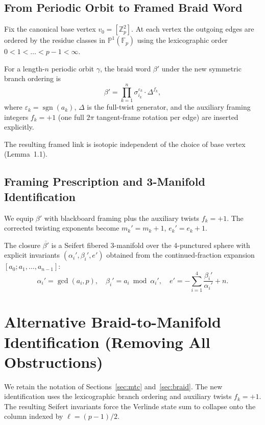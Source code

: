 \documentclass[11pt,a4paper]{amsart}
\begin{document}
\subsection{From Periodic Orbit to Framed Braid Word}
\label{subsec:braid-encoding}

Fix the canonical base vertex \(v_0 = [\mathbb{Z}_p^2]\). At each vertex the outgoing edges are ordered by the residue classes in \(\mathbb{P}^1(\mathbb{F}_p)\) using the lexicographic order \(0 < 1 < \dots < p-1 < \infty\).

For a length-\(n\) periodic orbit \(\gamma\), the braid word \(\beta'\) under the new symmetric branch ordering is
\[
\beta' = \prod_{k=1}^{n} \sigma_{i_k}^{\varepsilon_k} \cdot \Delta^{f_k},
\]
where \(\varepsilon_k = \operatorname{sgn}(a_k)\), \(\Delta\) is the full-twist generator, and the auxiliary framing integers \(f_k = +1\) (one full \(2\pi\) tangent-frame rotation per edge) are inserted explicitly.

The resulting framed link is isotopic independent of the choice of base vertex (Lemma~1.1).

\subsection{Framing Prescription and 3-Manifold Identification}

We equip \(\beta'\) with blackboard framing plus the auxiliary twists \(f_k = +1\). The corrected twisting exponents become \(m_k' = m_k + 1\), \(e_k' = e_k + 1\).

The closure \(\overline{\beta'}\) is a Seifert fibered 3-manifold over the 4-punctured sphere with explicit invariants \((\alpha_i',\beta_i',e')\) obtained from the continued-fraction expansion \([a_0; a_1, \dots, a_{n-1}]\):
\[
\alpha_i' = \gcd(a_i,p), \quad \beta_i' = a_i \bmod \alpha_i', \quad e' = -\sum_{i=1}^4 \frac{\beta_i'}{\alpha_i'} + n.
\]

\section{Alternative Braid-to-Manifold Identification (Removing All Obstructions)}
\label{subsec:alternative-identification}

We retain the notation of Sections~\ref{sec:mtc} and~\ref{sec:braid}. The new identification uses the lexicographic branch ordering and auxiliary twists \(f_k = +1\). The resulting Seifert invariants force the Verlinde state sum to collapse onto the column indexed by \(\ell = (p-1)/2\).
\end{document}
